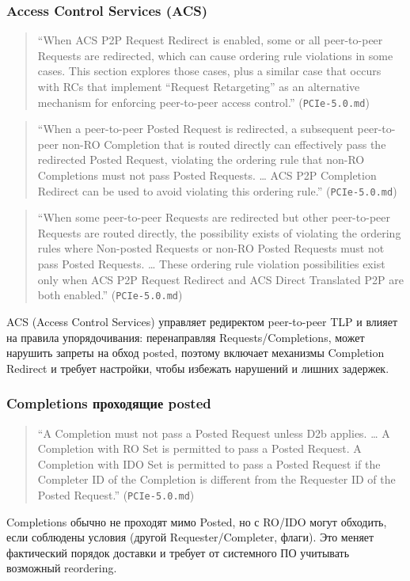 \documentclass[a4paper,12pt]{article}
\begin{document}
\subsubsection{Access Control Services (ACS)}
\begin{quote}
``When ACS P2P Request Redirect is enabled, some or all peer-to-peer Requests are redirected, which can cause ordering rule violations in some cases. This section explores those cases, plus a similar case that occurs with RCs that implement “Request Retargeting” as an alternative mechanism for enforcing peer-to-peer access control.'' (\texttt{PCIe-5.0.md})
\end{quote}
\begin{quote}
``When a peer-to-peer Posted Request is redirected, a subsequent peer-to-peer non-RO Completion that is routed directly can effectively pass the redirected Posted Request, violating the ordering rule that non-RO Completions must not pass Posted Requests. … ACS P2P Completion Redirect can be used to avoid violating this ordering rule.'' (\texttt{PCIe-5.0.md})
\end{quote}
\begin{quote}
``When some peer-to-peer Requests are redirected but other peer-to-peer Requests are routed directly, the possibility exists of violating the ordering rules where Non-posted Requests or non-RO Posted Requests must not pass Posted Requests. … These ordering rule violation possibilities exist only when ACS P2P Request Redirect and ACS Direct Translated P2P are both enabled.'' (\texttt{PCIe-5.0.md})
\end{quote}
ACS (Access Control Services) управляет редиректом peer-to-peer TLP и влияет на правила упорядочивания: перенаправляя Requests/Completions, может нарушить запреты на обход posted, поэтому включает механизмы Completion Redirect и требует настройки, чтобы избежать нарушений и лишних задержек.
\subsubsection{Completions проходящие posted}
\begin{quote}
``A Completion must not pass a Posted Request unless D2b applies. … A Completion with RO Set is permitted to pass a Posted Request. A Completion with IDO Set is permitted to pass a Posted Request if the Completer ID of the Completion is different from the Requester ID of the Posted Request.'' (\texttt{PCIe-5.0.md})
\end{quote}
Completions обычно не проходят мимо Posted, но с RO/IDO могут обходить, если соблюдены условия (другой Requester/Completer, флаги). Это меняет фактический порядок доставки и требует от системного ПО учитывать возможный reordering.
\end{document}
